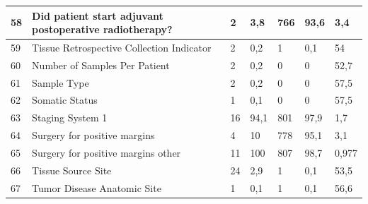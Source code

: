 \begin{table}[!htb]
	\footnotesize
	\centering
	\begin{threeparttable}
		\begin{tabular}{p{0.5cm} p{4cm} p{1.5cm} p{2cm} p{1.5cm} p{2cm} p{1.5cm}} \toprule
			58	&	Did patient start adjuvant postoperative radiotherapy?	&	2	&	3,8	&	766	&	93,6	&	3,4			
			\\ \hline	59	&	Tissue Retrospective Collection Indicator	&	2	&	0,2	&	1	&	0,1	&	54
			\\ \hline   60	&	Number of Samples Per Patient	&	2	&	0,2	&	0	&	0	&	52,7
			\\ \hline	61	&	Sample Type	&	2	&	0,2	&	0	&	0	&	57,5
			\\ \hline	62	&	Somatic Status	&	1	&	0,1	&	0	&	0	&	57,5
			\\ \hline	63	&	Staging System 1	&	16	&	94,1	&	801	&	97,9	&	1,7
			\\ \hline	64	&	Surgery for positive margins	&	4	&	10	&	778	&	95,1	&	3,1
			\\ \hline	65	&	Surgery for positive margins other	&	11	&	100	&	807	&	98,7	&	0,977
			\\ \hline	66	&	Tissue Source Site	&	24	&	2,9	&	1	&	0,1	&	53,5
			\\ \hline	67	&	Tumor Disease Anatomic Site	&	1	&	0,1	&	1	&	0,1	&	56,6
			\\ \hline
		\end{tabular}
	\end{threeparttable}
\end{table}